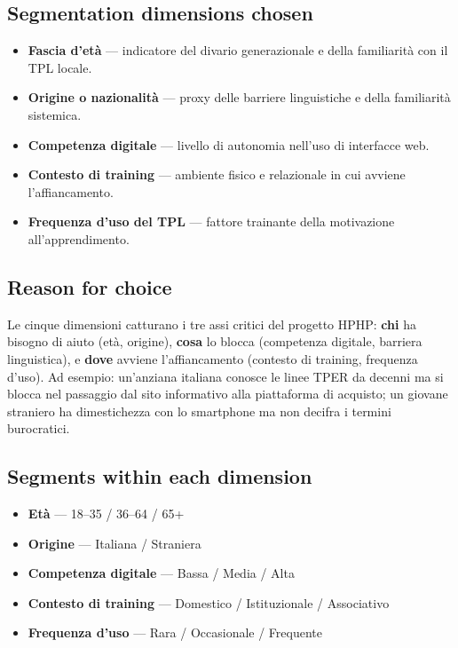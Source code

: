 ﻿\documentclass[11pt,a4paper]{article}
\begin{document}
\subsection{Segmentation dimensions chosen}

\begin{tcolorbox}[base]
\begin{itemize}[leftmargin=*,itemsep=4pt]
    \item \textbf{Fascia d'età} --- indicatore del divario generazionale
    e della familiarità con il TPL locale.
    \item \textbf{Origine o nazionalità} --- proxy delle barriere
    linguistiche e della familiarità sistemica.
    \item \textbf{Competenza digitale} --- livello di autonomia
    nell'uso di interfacce web.
    \item \textbf{Contesto di training} --- ambiente fisico e
    relazionale in cui avviene l'affiancamento.
    \item \textbf{Frequenza d'uso del TPL} --- fattore trainante
    della motivazione all'apprendimento.
\end{itemize}
\end{tcolorbox}

\vspace{0.4cm}

\subsection{Reason for choice}

Le cinque dimensioni catturano i tre assi critici del progetto HPHP:
\textbf{chi} ha bisogno di aiuto (età, origine), \textbf{cosa} lo blocca
(competenza digitale, barriera linguistica), e \textbf{dove} avviene
l'affiancamento (contesto di training, frequenza d'uso). Ad esempio:
un'anziana italiana conosce le linee TPER da decenni ma si blocca nel
passaggio dal sito informativo alla piattaforma di acquisto; un giovane
straniero ha dimestichezza con lo smartphone ma non decifra i termini
burocratici.

\vspace{0.4cm}

\begin{tcolorbox}[base]
\subsection{Segments within each dimension}
\begin{itemize}[leftmargin=*,itemsep=4pt]
\item \textbf{Età} --- 18--35 / 36--64 / 65+
\item \textbf{Origine} --- Italiana / Straniera
\item \textbf{Competenza digitale} --- Bassa / Media / Alta
\item \textbf{Contesto di training} --- Domestico / Istituzionale /
Associativo
\item \textbf{Frequenza d'uso} --- Rara / Occasionale / Frequente
\end{itemize}
\end{tcolorbox}
\end{document}
